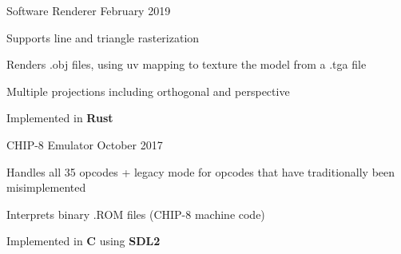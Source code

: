 

\begin{cventries}
    \cventry
    {Software Renderer} %
    {} %
    {}{February 2019}{
        \begin{cvitems} %
            \item {Supports line and triangle rasterization}
            \item {Renders .obj files, using uv mapping to texture the model from a .tga file}
            \item {Multiple projections including orthogonal and perspective}
            \item {Implemented in \textbf{Rust}}
        \end{cvitems}
    }


    \cventry
    {CHIP-8 Emulator} %
    {} %
    {}{October 2017}{
        \begin{cvitems} %
            \item {Handles all 35 opcodes + legacy mode for opcodes that have traditionally been misimplemented}
            \item {Interprets binary .ROM files (CHIP-8 machine code)}
            \item {Implemented in \textbf{C} using \textbf{SDL2}}
        \end{cvitems}
    }


\end{cventries}
